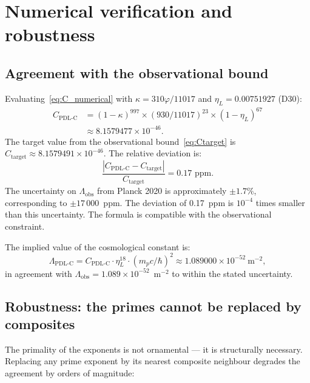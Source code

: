 \documentclass[12pt,a4paper]{article}
\newcommand{\hb}{\hbar}
\newcommand{\kap}{\kappa}
\newcommand{\etaL}{\eta_L}
\newcommand{\vp}{\varphi}
\newcommand{\Lam}{\Lambda}
\begin{document}
\section{Numerical verification and robustness}
\label{sec:robustness}

\subsection{Agreement with the observational bound}

Evaluating~\eqref{eq:C_numerical} with $\kap = 310\vp/11017$ and $\etaL = 0.00751927$ (D30):
\begin{align}
C_{\text{PDL-C}} &= (1-\kap)^{997} \times (930/11017)^{23} \times (1-\etaL)^{67} \nonumber \\
&\approx 8.1579477 \times 10^{-46}. \label{eq:C_PDLc_num}
\end{align}
The target value from the observational bound~\eqref{eq:Ctarget} is $C_{\text{target}} \approx 8.1579491 \times 10^{-46}$. The relative deviation is:
\begin{equation}
\frac{|C_{\text{PDL-C}} - C_{\text{target}}|}{C_{\text{target}}} = 0.17 \text{ ppm}.
\label{eq:deviation}
\end{equation}
The uncertainty on $\Lam_{\mathrm{obs}}$ from Planck 2020 is approximately $\pm 1.7\%$, corresponding to $\pm 17\,000$~ppm. The deviation of 0.17~ppm is $10^{-4}$ times smaller than this uncertainty. The formula is compatible with the observational constraint.

The implied value of the cosmological constant is:
\begin{equation}
\Lam_{\text{PDL-C}} = C_{\text{PDL-C}} \cdot \etaL^{18} \cdot (m_p c/\hb)^2 \approx 1.089000 \times 10^{-52}\ \text{m}^{-2},
\label{eq:Lambda_implied}
\end{equation}
in agreement with $\Lam_{\mathrm{obs}} = 1.089 \times 10^{-52}$~m$^{-2}$ to within the stated uncertainty.

\subsection{Robustness: the primes cannot be replaced by composites}

The primality of the exponents is not ornamental — it is structurally necessary. Replacing any prime exponent by its nearest composite neighbour degrades the agreement by orders of magnitude:
\end{document}
